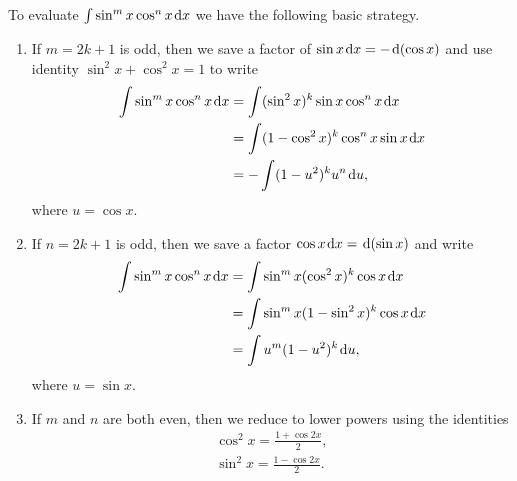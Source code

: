 \setcounter{chapter}{8}
\setcounter{section}{3}
\setcounter{theorem}{0}
\setcounter{equation}{0}


\begin{remark}
To evaluate $\int \sin^m x\cos^n x\mkern 2mu \mathrm{d} x$ we have the following basic strategy.
\begin{enumerate}
\item If $m=2k+1$ is odd, then we save a factor of $\sin x\mkern 2mu \mathrm{d} x = -\mkern 2mu \mathrm{d}(\cos x)$ and use identity $\sin^2 x + \cos^2 x = 1$ to write
\begin{equation*}
\begin{split}
\int \sin^m x \cos^n x\mkern 2mu \mathrm{d} x &= \int (\sin^2 x)^k\sin x\cos^n x\mkern 2mu \mathrm{d} x \\
&= \int (1-\cos^2 x)^k\cos^n x\sin x\mkern 2mu \mathrm{d} x\\
& = -\int (1-u^2)^ku^n\mkern 2mu \mathrm{d} u,
\end{split}
\end{equation*}
where $u=\cos x$.
\item If $n=2k+1$ is odd, then we save a factor $\cos x\mkern 2mu \mathrm{d} x = \mkern 2mu \mathrm{d}(\sin x)$ and write
\begin{equation*}
\begin{split}
\int \sin^m x \cos^n x\mkern 2mu \mathrm{d} x &= \int\sin^m x(\cos^2 x)^k\cos x\mkern 2mu \mathrm{d} x \\
&= \int\sin^m x(1-\sin^2 x)^k\cos x\mkern 2mu \mathrm{d} x \\
&= \int u^m(1-u^2)^k\mkern 2mu \mathrm{d} u,
\end{split}
\end{equation*}
where $u=\sin x$.
\item If $m$ and $n$ are both even, then we reduce to lower powers using the identities
\begin{align*}
\cos^2 x = \frac{1+\cos 2x}{2},\\
\sin^2 x = \frac{1-\cos 2x}{2}.
\end{align*}
\end{enumerate}
\end{remark}

